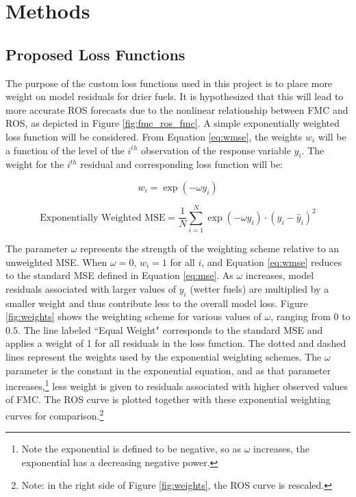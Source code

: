 \documentclass[11pt]{article}%
\begin{document}
\section{Methods}

\subsection{Proposed Loss Functions}

The purpose of the custom loss functions used in this project is to place more weight on model residuals for drier fuels. It is hypothesized that this will lead to more accurate ROS forecasts due to the nonlinear relationship between FMC and ROS, as depicted in Figure \ref{fig:fmc_ros_fmc}. A simple exponentially weighted loss function will be considered. From Equation \ref{eq:wmse}, the weights $w_i$ will be a function of the level of the $i^{th}$ observation of the response variable $y_i$. The weight for the $i^{th}$ residual and corresponding loss function will be:

\begin{equation}
    \label{eq:weights}
    w_i = \exp(-\omega y_i)
\end{equation}

\begin{equation}
    \label{eq:wloss}
    \text{Exponentially Weighted MSE} = \frac{1}{N}\sum_{i=1}^N \exp(-\omega y_i)\cdot (y_i - \hat y_i)^2
\end{equation}

The parameter $\omega$ represents the strength of the weighting scheme relative to an unweighted MSE. When $\omega = 0$, $w_i = 1$ for all $i$, and Equation \ref{eq:wmse} reduces to the standard MSE defined in Equation \ref{eq:mse}. As $\omega$ increases, model residuals associated with larger values of $y_i$ (wetter fuels) are multiplied by a smaller weight and thus contribute less to the overall model loss. Figure \ref{fig:weights} shows the weighting scheme for various values of $\omega$, ranging from $0$ to $0.5$. The line labeled ``Equal Weight" corresponds to the standard MSE and applies a weight of 1 for all residuals in the loss function. The dotted and dashed lines represent the weights used by the exponential weighting schemes. The $\omega$ parameter is the constant in the exponential equation, and as that parameter increases,\footnote{Note the exponential is defined to be negative, so as $\omega$ increases, the exponential has a decreasing negative power.} less weight is given to residuals associated with higher observed values of FMC. The ROS curve is plotted together with these exponential weighting curves for comparison.\footnote{Note: in the right side of Figure \ref{fig:weights}, the ROS curve is rescaled.} 
\end{document}
